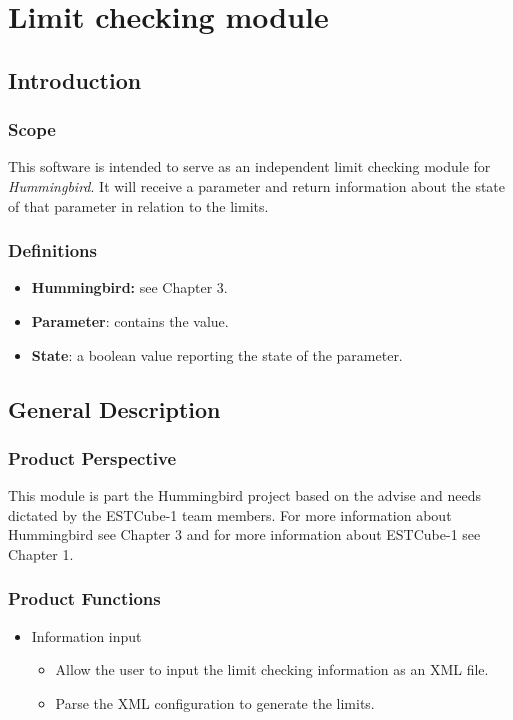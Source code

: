 \section{Limit checking module}

\subsection{Introduction}

\subsubsection{Scope}

This software is intended to serve as an independent limit checking module for \emph{Hummingbird}. It will receive a parameter and return information about the state of that parameter in relation to the limits.

\subsubsection{Definitions}

\begin{itemize}
\item \textbf{Hummingbird:} see Chapter 3.
\item \textbf{Parameter}: contains the value.
\item \textbf{State}: a boolean value reporting the state of the parameter.
\end{itemize}

\subsection{General Description}
\subsubsection{Product Perspective}

This module is part the Hummingbird project based on the advise and needs dictated by the ESTCube-1 team members. For more information about Hummingbird see Chapter 3 and for more information about ESTCube-1 see Chapter 1. 
\pagebreak
\subsubsection{Product Functions}

\begin{itemize}
\item Information input
\begin{itemize}
\item Allow the user to input the limit checking information as an XML file.
\item Parse the XML configuration to generate the limits.
\end{itemize}


\end{itemize}

